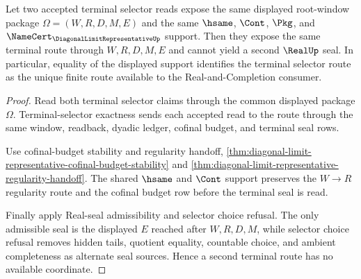 \begin{theorem}
\label{thm:diagonal-limit-representative-terminal-route-uniqueness}
Let two accepted terminal selector reads expose the same displayed root-window package $\Omega=(W,R,D,M,E)$ and the same $\hsame$, $\Cont$, $\Pkg$, and $\NameCert_{\DiagonalLimitRepresentativeUp}$ support. Then they expose the same terminal route through $W,R,D,M,E$ and cannot yield a second $\RealUp$ seal. In particular, equality of the displayed support identifies the terminal selector route as the unique finite route available to the Real-and-Completion consumer.
\end{theorem}
\begin{proof}
Read both terminal selector claims through the common displayed package $\Omega$. Terminal-selector exactness sends each accepted read to the route through the same window, readback, dyadic ledger, cofinal budget, and terminal seal rows.

Use cofinal-budget stability and regularity handoff, \autoref{thm:diagonal-limit-representative-cofinal-budget-stability} and \autoref{thm:diagonal-limit-representative-regularity-handoff}. The shared $\hsame$ and $\Cont$ support preserves the $W \to R$ regularity route and the cofinal budget row before the terminal seal is read.

Finally apply Real-seal admissibility and selector choice refusal. The only admissible seal is the displayed $E$ reached after $W,R,D,M$, while selector choice refusal removes hidden tails, quotient equality, countable choice, and ambient completeness as alternate seal sources. Hence a second terminal route has no available coordinate.
\end{proof}

